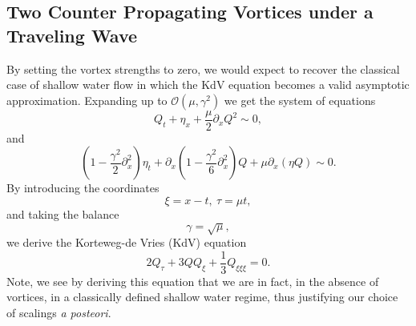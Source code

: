 \documentclass[a4paper,11pt]{article}
\newcommand{\p}{\partial}
\begin{document}
\subsection{Two Counter Propagating Vortices under a Traveling Wave}
By setting the vortex strengths to zero, we would expect to recover the classical 
case of shallow water flow in which the KdV equation becomes a valid asymptotic approximation.  
Expanding up to $\mathcal{O}(\mu,\gamma^{2})$ we get the system of equations 
\[
Q_{t} + \eta_{x} + \frac{\mu}{2}\p_{x}Q^{2} \sim 0, 
\]
and
\[
\left(1 - \frac{\gamma^{2}}{2}\p_{x}^{2}\right)\eta_{t} + \p_{x}\left(1-\frac{\gamma^{2}}{6}\p_{x}^{2} \right)Q + \mu \p_{x}(\eta Q) \sim 0.
\]
By introducing the coordinates
\[
\xi = x - t, ~ \tau = \mu t, 
\]
and taking the balance 
\[
\gamma = \sqrt{\mu}, 
\]
we derive the Korteweg-de Vries (KdV) equation
\[
2Q_{\tau} + 3QQ_{\xi} + \frac{1}{3} Q_{\xi\xi\xi} = 0.
\]
Note, we see by deriving this equation that we are in fact, in the absence of vortices, in a classically defined shallow water regime, thus justifying our choice of scalings {\it a posteori}.  
\end{document}

